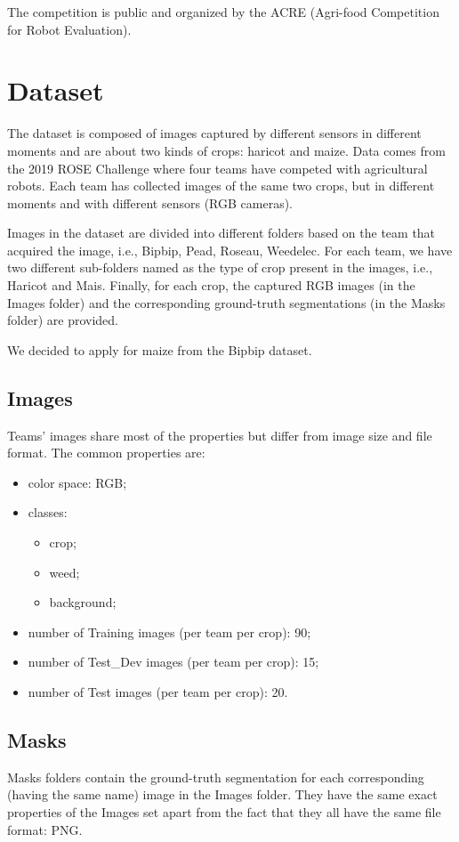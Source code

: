 \documentclass[12pt,a4paper]{report}
\begin{document}
The competition is public and  organized by the ACRE (Agri-food Competition for Robot Evaluation).

	\section{Dataset}
The dataset is composed of images captured by different sensors in different moments and are about two kinds of crops: haricot and maize. Data comes from the 2019 ROSE Challenge where four teams have competed with agricultural robots. Each team has collected images of the same two crops, but in different moments and with different sensors (RGB cameras).

Images in the dataset are divided into different folders based on the team that acquired the image, i.e., Bipbip, Pead, Roseau, Weedelec. For each team, we have two different sub-folders named as the type of crop present in the images, i.e., Haricot and Mais. Finally, for each crop, the captured RGB images (in the Images folder) and the corresponding ground-truth segmentations (in the Masks folder) are provided.
	
We decided to apply for maize from the Bipbip dataset.
	\subsection{Images}
Teams' images share most of the properties but differ from image size and file format. The common properties are:
\begin{itemize}

\item{color space: RGB;}
\item{classes:}
\begin{itemize}
\item{crop;}
\item{weed;}
\item{background;}
\end{itemize}
\item{number of Training images (per team per crop): 90;}
\item{number of Test\_Dev images (per team per crop): 15;}
\item{number of Test images (per team per crop): 20.}
\end{itemize}
	\subsection{Masks}
Masks folders contain the ground-truth segmentation for each corresponding (having the same name) image in the Images folder. They have the same exact properties of the Images set apart from the fact that they all have the same file format: PNG.
\end{document}
